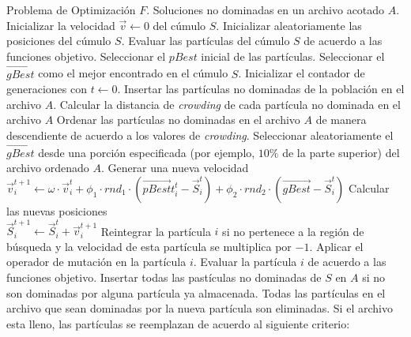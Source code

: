 \begin{itemize}
\begin{algorithm}
      \begin{algorithmic}[1]			
	    \REQUIRE Problema de Optimizaci\'on $F$.
	\ENSURE Soluciones no dominadas en un archivo acotado $A$.	  	  
	  \STATE Inicializar la velocidad $\vec{v} \leftarrow 0$ del c\'umulo $S$.
	  \STATE Inicializar aleatoriamente las posiciones del c\'umulo $S$.
	  \STATE Evaluar las part\'iculas del c\'umulo $S$ de acuerdo a las funciones objetivo.
	  \STATE Seleccionar el $pBest$ inicial de las part\'iculas.
	  \STATE Seleccionar el $\vec{gBest}$ como el mejor encontrado en el c\'umulo $S$.
	  \STATE Inicializar el contador de generaciones con $t \leftarrow 0$.
	  \STATE Insertar las part\'iculas no dominadas de la poblaci\'on en el archivo $A$.	  
	  \STATE Calcular la distancia de \textit{crowding} de cada part\'icula no dominada en el archivo $A$
	  \STATE Ordenar las part\'iculas no dominadas en el archivo $A$ de manera descendiente de acuerdo a los valores 
	     de \textit{crowding}.	   
	      \STATE Seleccionar aleatoriamente el $\vec{gBest}$ desde una porci\'on especificada (por ejemplo, $10\%$ de la parte superior) 
	      del archivo ordenado $A$.
	     \STATE Generar una nueva velocidad 
		\\  $\vec{v}^{t+1}_{i} \leftarrow \omega \cdot \vec{v}^t_{i} + \phi_1 \cdot rnd_1 \cdot \left(\vec{pBest}t^t_i - \vec{S}^t_{i} \right) 
					    + \phi_2 \cdot rnd_2 \cdot \left(\vec{gBest} - \vec{S}^t_{i} \right)$	
	      \STATE Calcular las nuevas posiciones 
		\\$\vec{S}^{t+1}_{i} \leftarrow \vec{S}^{t}_{i}+\vec{v}^{t+1}_{i}$
	      \STATE Reintegrar la part\'icula $i$ si no pertenece a la regi\'on de b\'usqueda y la velocidad de esta part\'icula se 
	      multiplica por $-1$.	      
		\STATE Aplicar el operador de mutaci\'on en la part\'icula $i$.
	      \ENDIF
	      \STATE Evaluar la part\'icula $i$ de acuerdo a las funciones objetivo.
	     \ENDFOR					  
	  \STATE Insertar todas las past\'iculas no dominadas de $S$ en $A$ si no son dominadas por alguna part\'icula ya almacenada.
	  Todas las part\'iculas en el archivo que sean dominadas por la nueva part\'icula son eliminadas. Si el archivo esta lleno,
	  las part\'iculas se reemplazan de acuerdo al siguiente criterio:
	    \begin{itemize}

\end{itemize}
\end{algorithmic}
\end{algorithm}
\end{itemize}
